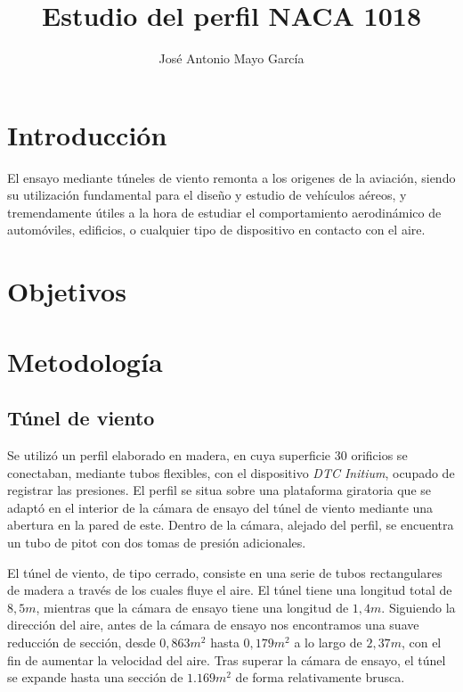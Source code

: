 \documentclass{article}
\title{Estudio del perfil NACA 1018}
\author{José Antonio Mayo García}
\begin{document}
\maketitle

\tableofcontents

\section{Introducción}

El ensayo mediante túneles de viento remonta a los origenes de la aviación, siendo su utilización fundamental para el diseño
y estudio de vehículos aéreos, y tremendamente útiles a la hora de estudiar el comportamiento aerodinámico de automóviles,
edificios, o cualquier tipo de dispositivo en contacto con el aire. \cite{Barlow1999-wm}

\section{Objetivos}

\section{Metodología}

\subsection{Túnel de viento}

Se utilizó un perfil elaborado en madera, en cuya superficie 30 orificios se conectaban, mediante tubos flexibles, 
con el dispositivo \textit{DTC Initium}, ocupado de registrar las presiones. El perfil se situa sobre una plataforma giratoria que se 
adaptó en el interior de la cámara de ensayo del túnel de viento mediante una abertura en la pared de este. Dentro de la cámara,
alejado del perfil, se encuentra un tubo de pitot con dos tomas de presión adicionales.

El túnel de viento, de tipo cerrado, consiste en una serie de tubos rectangulares de madera a través de los cuales fluye el aire.
El túnel tiene una longitud total de $8,5m$, mientras que la cámara de ensayo tiene una longitud de $1,4m$. Siguiendo la dirección
del aire, antes de la cámara de ensayo nos encontramos una suave reducción de sección, desde $0,863m^2$ hasta $0,179m^2$ 
a lo largo de $2,37m$, con el fin de aumentar la velocidad del aire. Tras superar la cámara de ensayo, el túnel se expande
hasta una sección de $1.169m^2$ de forma relativamente brusca. 
\end{document}
